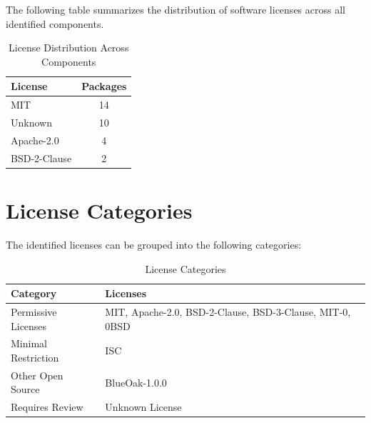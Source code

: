 The following table summarizes the distribution of software licenses across all identified components.

\begin{table}[H]
\centering
\small
\renewcommand{\arraystretch}{1.3}

\begin{tabular}{p{6cm}c}
\toprule
\rowcolor{ZWPrimary}
\textbf{\color{white}License} & \textbf{\color{white}Packages} \\
\midrule
MIT & 14 \\
Unknown & 10 \\
Apache-2.0 & 4 \\
BSD-2-Clause & 2 \\
\bottomrule
\end{tabular}
\caption{License Distribution Across Components}
\end{table}

\vspace{0.4cm}


\section{License Categories}

The identified licenses can be grouped into the following categories:

\begin{table}[H]
\centering
\small
\renewcommand{\arraystretch}{1.3}

\begin{tabular}{p{5cm}p{8cm}}
\toprule
\rowcolor{ZWPrimary}
\textbf{\color{white}Category} & \textbf{\color{white}Licenses} \\
\midrule
Permissive Licenses & MIT, Apache-2.0, BSD-2-Clause, BSD-3-Clause, MIT-0, 0BSD \\
Minimal Restriction & ISC \\
Other Open Source & BlueOak-1.0.0 \\
Requires Review & Unknown License \\
\bottomrule
\end{tabular}
\caption{License Categories}
\end{table}

\vspace{0.4cm}


